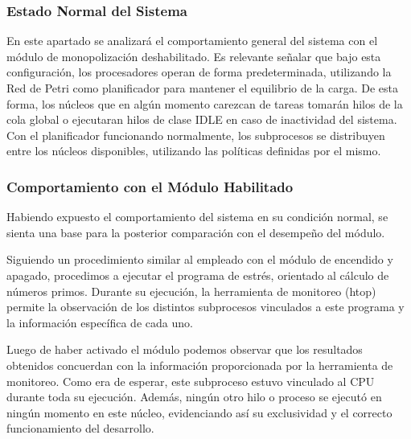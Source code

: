 \subsubsection{Estado Normal del Sistema}
En este apartado se analizará el comportamiento general del sistema con el módulo de monopolización deshabilitado. Es relevante señalar que bajo esta configuración, los procesadores operan de forma predeterminada, utilizando la Red de Petri como planificador para mantener el equilibrio de la carga. De esta forma, los núcleos que en algún momento carezcan de tareas tomarán hilos de la cola global o ejecutaran hilos de clase IDLE en caso de inactividad del sistema. Con el planificador funcionando normalmente, los subprocesos se distribuyen entre los núcleos disponibles, utilizando las políticas definidas por el mismo.\par



\subsubsection{Comportamiento con el Módulo Habilitado}
Habiendo expuesto el comportamiento del sistema en su condición normal, se sienta una base para la posterior comparación con el desempeño del módulo.\par

Siguiendo un procedimiento similar al empleado con el módulo de encendido y apagado, procedimos a ejecutar el programa de estrés, orientado al cálculo de números primos. Durante su ejecución, la herramienta de monitoreo (htop) permite la observación de los distintos subprocesos vinculados a este programa y la información específica de cada uno.\par

Luego de haber activado el módulo podemos observar que los resultados obtenidos concuerdan con la información proporcionada por la  herramienta de monitoreo. Como era de esperar, este subproceso estuvo vinculado al CPU durante toda su ejecución. Además, ningún otro hilo o proceso se ejecutó en ningún momento en este núcleo, evidenciando así su exclusividad y el correcto funcionamiento del desarrollo.\par


